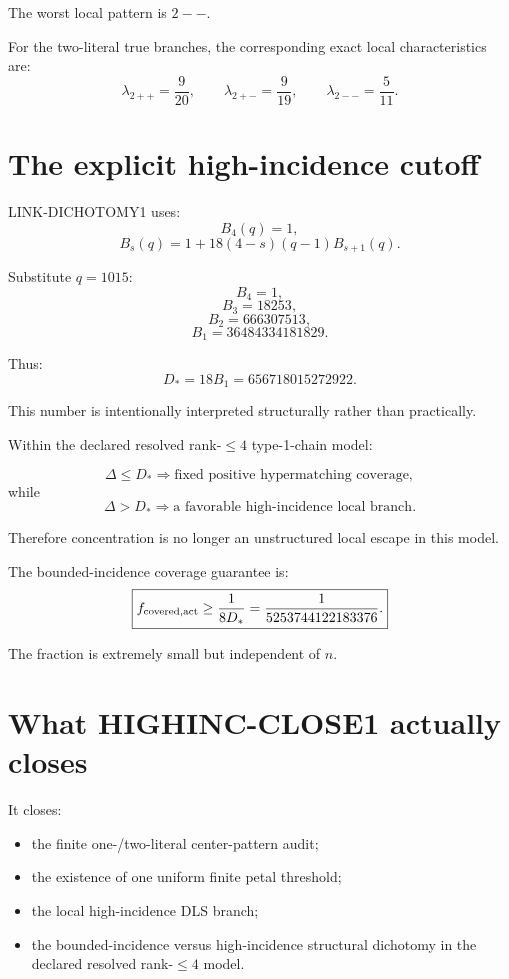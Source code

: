 \documentclass[11pt]{article}
\theoremstyle{plain}
\theoremstyle{definition}
\theoremstyle{remark}
\begin{document}
The worst local pattern is \(2--\).

For the two-literal true branches, the corresponding exact local
characteristics are:
\[
\lambda_{2++}=\frac9{20},
\qquad
\lambda_{2+-}=\frac9{19},
\qquad
\lambda_{2--}=\frac5{11}.
\]

\section{The explicit high-incidence cutoff}

LINK-DICHOTOMY1 uses:
\[
B_4(q)=1,
\]
\[
B_s(q)
=
1+18(4-s)(q-1)B_{s+1}(q).
\]

Substitute \(q=1015\):
\[
B_4=1,
\]
\[
B_3=18253,
\]
\[
B_2=666307513,
\]
\[
B_1=36484334181829.
\]

Thus:
\[
\boxed{
D_*
=
18B_1
=
656718015272922.
}
\]

This number is intentionally interpreted structurally rather than
practically.

\begin{provedbox}
Within the declared resolved rank-\(\le4\) type-1-chain model:

\[
\Delta\le D_*
\Rightarrow
\text{fixed positive hypermatching coverage},
\]
while
\[
\Delta>D_*
\Rightarrow
\text{a favorable high-incidence local branch}.
\]

Therefore concentration is no longer an unstructured local escape in this
model.
\end{provedbox}

The bounded-incidence coverage guarantee is:
\[
\boxed{
f_{\rm covered,act}
\ge
\frac1{8D_*}
=
\frac1{5253744122183376}.
}
\]

The fraction is extremely small but independent of \(n\).

\section{What HIGHINC-CLOSE1 actually closes}

It closes:
\begin{itemize}[leftmargin=1.4em]
\item the finite one-/two-literal center-pattern audit;
\item the existence of one uniform finite petal threshold;
\item the local high-incidence DLS branch;
\item the bounded-incidence versus high-incidence structural dichotomy in the
declared resolved rank-\(\le4\) model.
\end{itemize}
\end{document}
